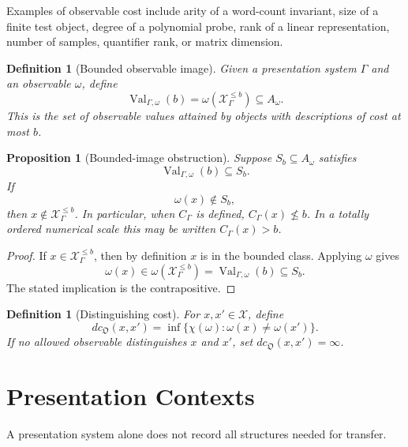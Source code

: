 \documentclass[11pt]{article}
\newtheorem{proposition}[theorem]{Proposition}
\newtheorem{definition}[theorem]{Definition}
\begin{document}
Examples of observable cost include arity of a word-count invariant, size of a finite test object, degree of a polynomial probe, rank of a linear representation, number of samples, quantifier rank, or matrix dimension.

\begin{definition}[Bounded observable image]
Given a presentation system \(\Gamma\) and an observable \(\omega\), define
\[
\operatorname{Val}_{\Gamma,\omega}(b)
=
\omega(\mathcal X_\Gamma^{\leq b})\subseteq A_\omega.
\]
This is the set of observable values attained by objects with descriptions of cost at most \(b\).
\end{definition}

\begin{proposition}[Bounded-image obstruction]
Suppose \(S_b\subseteq A_\omega\) satisfies
\[
\operatorname{Val}_{\Gamma,\omega}(b)\subseteq S_b.
\]
If
\[
\omega(x)\notin S_b,
\]
then \(x\notin\mathcal X_\Gamma^{\leq b}\). In particular, when \(C_\Gamma\) is defined, \(C_\Gamma(x)\nleq b\). In a totally ordered numerical scale this may be written \(C_\Gamma(x)>b\).
\end{proposition}

\begin{proof}
If \(x\in\mathcal X_\Gamma^{\leq b}\), then by definition \(x\) is in the bounded class. Applying \(\omega\) gives
\[
\omega(x)\in\omega(\mathcal X_\Gamma^{\leq b})
=
\operatorname{Val}_{\Gamma,\omega}(b)
\subseteq S_b.
\]
The stated implication is the contrapositive.
\end{proof}

\begin{definition}[Distinguishing cost]
For \(x,x'\in\mathcal X\), define
\[
dc_{\mathfrak O}(x,x')
=
\inf\{\chi(\omega):\omega(x)\ne\omega(x')\}.
\]
If no allowed observable distinguishes \(x\) and \(x'\), set \(dc_{\mathfrak O}(x,x')=\infty\).
\end{definition}

\section{Presentation Contexts}

A presentation system alone does not record all structures needed for transfer.
\end{document}
